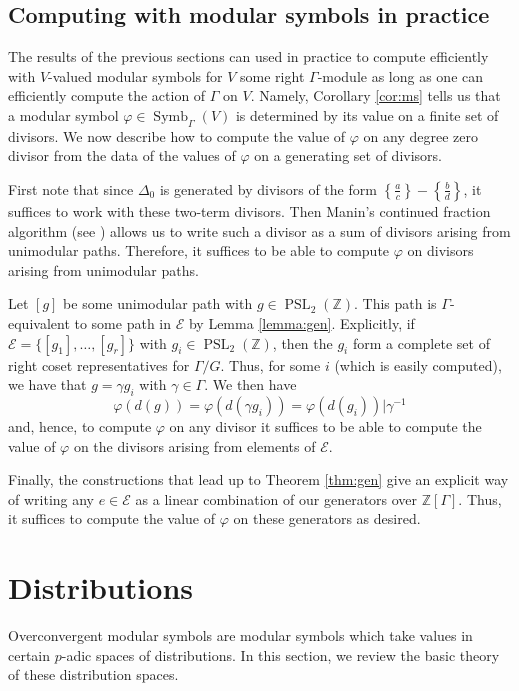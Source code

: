 \documentclass{amsart}
\theoremstyle{plain}
\theoremstyle{definition}
\newcommand{\E}{{\mathcal E}}
\newcommand{\Z}{{\mathbb Z}}
\DeclareMathOperator{\PSL}{PSL}
\DeclareMathOperator{\Symb}{Symb}
\newcommand{\MS}[1]{\Symb_{\Gamma}(#1)}
\begin{document}
\subsection{Computing with modular symbols in practice}

The results of the previous sections can used in practice to compute efficiently with $V$-valued modular symbols for $V$ some right $\Gamma$-module as long as one can efficiently compute the action of $\Gamma$ on $V$.  Namely, Corollary \ref{cor:ms} tells us that a modular symbol $\varphi \in \MS{V}$ is determined by its value on a finite set of divisors.  We now describe how to compute the value of $\varphi$ on any degree zero divisor from the data of the values of $\varphi$ on a generating set of divisors.

First note that since $\Delta_0$ is generated by divisors of the
form $\left\{\frac{a}{c}\right\} - \left\{\frac{b}{d}\right\}$, it
suffices to work with these two-term divisors.  Then Manin's
continued fraction algorithm (see \cite{Manin}) allows us to write
such a divisor as a sum of divisors arising from unimodular paths.
Therefore, it suffices to be able to compute $\varphi$ on divisors
arising from unimodular paths.

Let $[g]$ be some unimodular path with $g \in \PSL_2(\Z)$.  This
path is $\Gamma$-equivalent to some path in $\E$ by Lemma
\ref{lemma:gen}. Explicitly, if $\E = \{[g_1], \dots, [g_r]\}$
with $g_i \in \PSL_2(\Z)$, then the $g_i$ form a complete set of
right coset representatives for $\Gamma / G$.  Thus, for some $i$
(which is easily computed), we have that $g = \gamma g_i$ with
$\gamma \in \Gamma$. We then have 
$$
\varphi(d(g)) = \varphi(d(\gamma g_i)) = \varphi(d(g_i))\big| \gamma^{-1}
$$ 
and, hence, to compute $\varphi$ on any divisor it suffices to be able to compute the value of $\varphi$ on the divisors arising from elements of $\E$.  

Finally, the constructions that lead up to Theorem \ref{thm:gen} 
give an explicit way of writing any $e \in \E$ as a linear
combination of our generators over $\Z[\Gamma]$.  Thus, it suffices to compute the value of $\varphi$ on these generators as desired.

\section{Distributions}
\label{sec:dist}

Overconvergent modular symbols are modular symbols which take values in certain $p$-adic spaces of distributions.  In this section, we review the basic theory of these distribution spaces.
\end{document}

